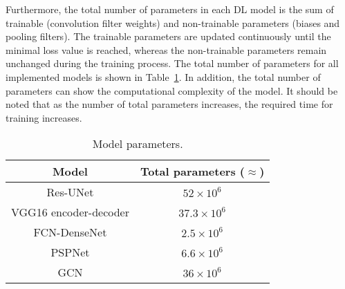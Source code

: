 
Furthermore, the total number of parameters in each DL model is the sum of trainable (convolution filter weights) and non-trainable parameters (biases and pooling filters).
The trainable parameters are updated continuously until the minimal loss value is reached, whereas the non-trainable parameters remain unchanged during the training process.
The total number of parameters for all implemented models is shown in Table~\ref{tab:table_parameters}.
In addition, the total number of parameters can show the computational complexity of the model.
It should be noted that as the number of total parameters increases, the required time for training increases.
\begin{table}[]
	\centering
	\caption{Model parameters.}
	\label{tab:table_parameters}
	\begin{tabular}{cc}\hline
		Model & Total parameters (\(\approx\)) \\ \hline
		Res-UNet & \(52\times 10^6\) \\ 
		VGG16 encoder-decoder & \(37.3\times 10^6\) \\
		FCN-DenseNet & \(2.5\times 10^6\) \\ 
		PSPNet & \(6.6\times 10^6\) \\ 
		GCN & \(36\times 10^6\) \\ \hline
	\end{tabular}
\end{table}
